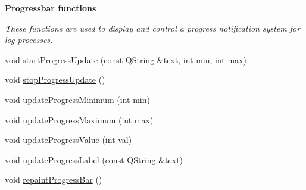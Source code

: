 \begin{Indent}{\bf Progressbar functions}\par
{\em These functions are used to display and control a progress notification system for log processes. }\begin{DoxyCompactItemize}
\item 
void \hyperlink{classGlobalSearch_1_1AbstractDialog_ac2b3d31770c83a49b8d817a857ef377e}{start\-Progress\-Update} (const Q\-String \&text, int min, int max)
\item 
void \hyperlink{classGlobalSearch_1_1AbstractDialog_a5159109a62a0d755a6d201bce5ab6466}{stop\-Progress\-Update} ()
\item 
void \hyperlink{classGlobalSearch_1_1AbstractDialog_a37d58a75a23e7082963937caba89e47f}{update\-Progress\-Minimum} (int min)
\item 
void \hyperlink{classGlobalSearch_1_1AbstractDialog_aeadfeb3807fd25918136263e13634827}{update\-Progress\-Maximum} (int max)
\item 
void \hyperlink{classGlobalSearch_1_1AbstractDialog_a33bc475a9faf3f8307beaa2b20bf3c1c}{update\-Progress\-Value} (int val)
\item 
void \hyperlink{classGlobalSearch_1_1AbstractDialog_a74180c40bc787fae62909aa3cde450a3}{update\-Progress\-Label} (const Q\-String \&text)
\item 
void \hyperlink{classGlobalSearch_1_1AbstractDialog_a2b2e126bf000fb92e962f1c4db71a231}{repaint\-Progress\-Bar} ()
\end{DoxyCompactItemize}
\end{Indent}
